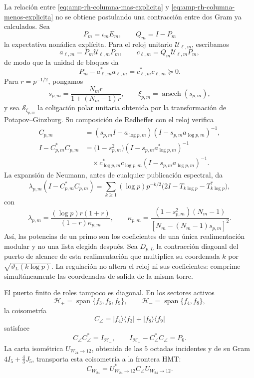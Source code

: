 La relación entre
\eqref{eq:amp-rh-columna-mas-explicita} y
\eqref{eq:amp-rh-columna-menos-explicita} no se obtiene postulando una
contracción entre dos Gram ya calculados. Sea
\[
 P_m=\iota_mE_m,\qquad Q_m=I-P_m
\]
la expectativa nonádica explícita. Para el reloj unitario
\(\mathscr U_{\ell,m}\), escribamos
\[
 a_{\ell,m}=P_m\mathscr U_{\ell,m}P_m,\qquad
 c_{\ell,m}=Q_m\mathscr U_{\ell,m}P_m ,
\]
de modo que la unidad de bloques da
\begin{equation}\label{eq:amp-rh-defecto-schwarz-reloj}
 P_m-a_{\ell,m}^*a_{\ell,m}
 =c_{\ell,m}^*c_{\ell,m}\succeq0.
\end{equation}
Para \(r=p^{-1/2}\), pongamos
\[
 s_{p,m}=\frac{N_mr}{1+(N_m-1)r},
 \qquad \xi_{p,m}=\operatorname{arsech}(s_{p,m}),
\]
y sea \(\mathscr S_{\xi_{p,m}}\) la coligación polar unitaria obtenida por
la transformación de Potapov--Ginzburg. Su composición de Redheffer con
el reloj verifica
\begin{align}
 C_{p,m}&=(s_{p,m}I-a_{\log p,m})
          (I-s_{p,m}a_{\log p,m})^{-1},\nonumber\\
 I-C_{p,m}^*C_{p,m}
 &=\bigl(1-s_{p,m}^2\bigr)
   (I-s_{p,m}a_{\log p,m}^*)^{-1}\nonumber\\
 &\quad{}\times c_{\log p,m}^*c_{\log p,m}
   (I-s_{p,m}a_{\log p,m})^{-1}.
   \label{eq:amp-rh-redheffer-defecto}
\end{align}
La expansión de Neumann, antes de cualquier publicación espectral, da
\begin{equation}\label{eq:amp-rh-torre-prima-explicita}
 \lambda_{p,m}(I-C_{p,m}^*C_{p,m})
 =\sum_{k\geq1}(\log p)p^{-k/2}
  \bigl(2I-T_{k\log p}-T_{k\log p}^*\bigr),
\end{equation}
con
\[
 \lambda_{p,m}
 =\frac{(\log p)r(1+r)}
 {(1-r)\kappa_{p,m}},
 \qquad
 \kappa_{p,m}
 =\frac{(1-s_{p,m}^2)(N_m-1)}
 {[N_m-(N_m-1)s_{p,m}]^2}.
\]
Así, las potencias de un primo son los coeficientes de una única
realimentación modular y no una lista elegida después.
Sea \(D_{p,L}\) la contracción diagonal del puerto de alcance de esta
realimentación que multiplica su coordenada \(k\) por
\(\sqrt{\vartheta_L(k\log p)}\). La regulación no altera el reloj ni sus
coeficientes: comprime simultáneamente las coordenadas de salida de la misma
torre.

El puerto finito de roles tampoco es diagonal. En los sectores activos
\[
 \mathcal H_+
 =\operatorname{span}\{f_3,f_6,f_9\},\qquad
 \mathcal H_-=\operatorname{span}\{f_4,f_8\},
\]
la coisometría
\begin{equation}\label{eq:amp-rh-acoplamiento-angular}
 C_\angle
 =|f_4\rangle\langle f_3|
  +|f_8\rangle\langle f_9|
\end{equation}
satisface
\[
 C_\angle C_\angle^*=I_{\mathcal H_-},\qquad
 I_{\mathcal H_+}-C_\angle^*C_\angle=P_6.
\]
La carta isométrica \(U_{W_{24}\to12}\), obtenida de las \(5\) octadas
incidentes y de su Gram
\(4I_5+\frac43J_5\), transporta esta coisometría a la frontera HMT:
\[
 C_{W_{24}}
 =U_{W_{24}\to12}^*C_\angle U_{W_{24}\to12}.
\]

